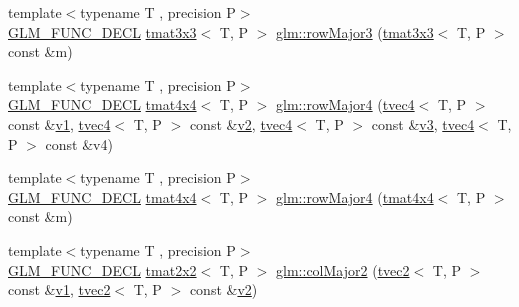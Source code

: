 \begin{DoxyCompactItemize}
\item 
{\footnotesize template$<$typename T , precision P$>$ }\\\mbox{\hyperlink{setup_8hpp_ab2d052de21a70539923e9bcbf6e83a51}{G\+L\+M\+\_\+\+F\+U\+N\+C\+\_\+\+D\+E\+CL}} \mbox{\hyperlink{structglm_1_1tmat3x3}{tmat3x3}}$<$ T, P $>$ \mbox{\hyperlink{group__gtx__matrix__major__storage_ga38537061135b55e7a053926ca55e6e20}{glm\+::row\+Major3}} (\mbox{\hyperlink{structglm_1_1tmat3x3}{tmat3x3}}$<$ T, P $>$ const \&m)
\item 
{\footnotesize template$<$typename T , precision P$>$ }\\\mbox{\hyperlink{setup_8hpp_ab2d052de21a70539923e9bcbf6e83a51}{G\+L\+M\+\_\+\+F\+U\+N\+C\+\_\+\+D\+E\+CL}} \mbox{\hyperlink{structglm_1_1tmat4x4}{tmat4x4}}$<$ T, P $>$ \mbox{\hyperlink{group__gtx__matrix__major__storage_ga3ce8f2a78fb2f15bf28151ee128b0ae8}{glm\+::row\+Major4}} (\mbox{\hyperlink{structglm_1_1tvec4}{tvec4}}$<$ T, P $>$ const \&\mbox{\hyperlink{glad_8h_a0779c3b73f9aa3a0ac5b0139b5d291d9}{v1}}, \mbox{\hyperlink{structglm_1_1tvec4}{tvec4}}$<$ T, P $>$ const \&\mbox{\hyperlink{glad_8h_a9a09a1837922b2b806f4589096a52049}{v2}}, \mbox{\hyperlink{structglm_1_1tvec4}{tvec4}}$<$ T, P $>$ const \&\mbox{\hyperlink{glad_8h_acc806b31cbf466ceba6555983d8b814d}{v3}}, \mbox{\hyperlink{structglm_1_1tvec4}{tvec4}}$<$ T, P $>$ const \&v4)
\item 
{\footnotesize template$<$typename T , precision P$>$ }\\\mbox{\hyperlink{setup_8hpp_ab2d052de21a70539923e9bcbf6e83a51}{G\+L\+M\+\_\+\+F\+U\+N\+C\+\_\+\+D\+E\+CL}} \mbox{\hyperlink{structglm_1_1tmat4x4}{tmat4x4}}$<$ T, P $>$ \mbox{\hyperlink{group__gtx__matrix__major__storage_ga85771a88c114a088a0414bcfce55e729}{glm\+::row\+Major4}} (\mbox{\hyperlink{structglm_1_1tmat4x4}{tmat4x4}}$<$ T, P $>$ const \&m)
\item 
{\footnotesize template$<$typename T , precision P$>$ }\\\mbox{\hyperlink{setup_8hpp_ab2d052de21a70539923e9bcbf6e83a51}{G\+L\+M\+\_\+\+F\+U\+N\+C\+\_\+\+D\+E\+CL}} \mbox{\hyperlink{structglm_1_1tmat2x2}{tmat2x2}}$<$ T, P $>$ \mbox{\hyperlink{group__gtx__matrix__major__storage_ga599fff4f1c65912b256a82138ebcca37}{glm\+::col\+Major2}} (\mbox{\hyperlink{structglm_1_1tvec2}{tvec2}}$<$ T, P $>$ const \&\mbox{\hyperlink{glad_8h_a0779c3b73f9aa3a0ac5b0139b5d291d9}{v1}}, \mbox{\hyperlink{structglm_1_1tvec2}{tvec2}}$<$ T, P $>$ const \&\mbox{\hyperlink{glad_8h_a9a09a1837922b2b806f4589096a52049}{v2}})
\item 

\end{DoxyCompactItemize}
